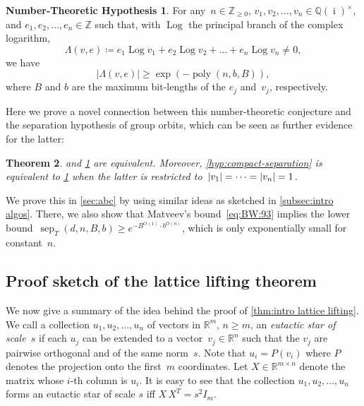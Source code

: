 \documentclass[10pt,a4paper]{article}
\newtheorem{theorem}{Theorem}[section]
\theoremstyle{definition}
\newtheorem{numhypothesis}[theorem]{Number-Theoretic Hypothesis}\crefname{numhypothesis}{Number-Theoretic Hypothesis}{Number-Theoretic Hypotheses}
\DeclareMathOperator{\poly}{poly}
\DeclareMathOperator{\sep}{sep}
\DeclareMathOperator{\ii}{i}
\DeclareMathOperator{\Log}{Log}
\newcommand{\QQ}{\mathbb{Q}}
\newcommand{\ZZ}{\mathbb{Z}}
\newcommand{\RR}{\mathbb{R}}
\newcommand{\NN}{\mathbb{Z}_{\geq 0}}
\DeclarePairedDelimiter\abs{\lvert}{\rvert}
\numberwithin{equation}{section}
\begin{document}
\begin{numhypothesis}\label{hyp:linearforms}
For any~$n\in\NN$, $v_1,v_2,\dots,v_n\in\QQ(\ii)^\times$, and $e_1,e_2,\dots,e_n\in\ZZ$ such that,
with $\Log$ the principal branch of the complex logarithm,
\[
  \Lambda(v,e) \coloneqq e_1 \Log v_1 + e_2 \Log v_2 +\dots +e_n\Log v_n \neq 0,
\]
we have
\[
	|\Lambda(v,e)| \geq \exp(-\poly(n,b,B)),
\]
where $B$ and $b$ are the maximum bit-lengths of the $e_j$ and~$v_j$, respectively.
\end{numhypothesis}

Here we prove a novel connection between this number-theoretic conjecture and
the separation hypothesis of group orbits, which can be seen as further evidence for the latter:


\begin{theorem}\label{thm:abc-and-sep}
 and \cref{hyp:linearforms} are equivalent.
Moreover, \cref{hyp:compact-separation} is equivalent to \cref{hyp:linearforms}
when the latter is restricted to~$\abs{v_1}=\dots=\abs{v_n}=1$.
\end{theorem}


We prove this in \cref{sec:abc} by using similar ideas as sketched in \cref{subsec:intro algos}.
There, we also show that Matveev's bound~\eqref{eq:BW:93} implies
the lower bound~$\sep_T(d,n,B,b) \geq e^{-B^{O(1)} \cdot b^{O(n)}}$,
which is only exponentially small for constant~$n$.

\subsection{Proof sketch of the lattice lifting theorem}\label{subsec:proof ideas}
We now give a summary of the idea behind the proof of \cref{thm:intro lattice lifting}.
We call a collection $u_1,u_2,\dots,u_n$ of vectors in $\RR^m$, $n\ge m$,
an \emph{eutactic star of scale~$s$}
if each $u_j$ can be extended to a vector~$v_j\in\RR^n$ such that the $v_j$ are pairwise orthogonal
and of the same norm~$s$.
Note that $u_i=P(v_i)$ where $P$ denotes the projection onto the first~$m$ coordinates.
Let $X\in\RR^{m\times n}$ denote the matrix whose $i$-th column is $u_i$.
It is easy to see that the collection $u_1,u_2,\dots,u_n$ forms an eutactic star of scale $s$
iff $X\, X^T = s^2 I_m$.
\end{document}

